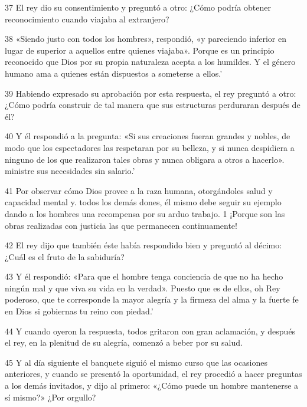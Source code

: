 \par 37 El rey dio su consentimiento y preguntó a otro: ¿Cómo podría obtener reconocimiento cuando viajaba al extranjero?

\par 38 «Siendo justo con todos los hombres», respondió, «y pareciendo inferior en lugar de superior a aquellos entre quienes viajaba». Porque es un principio reconocido que Dios por su propia naturaleza acepta a los humildes. Y el género humano ama a quienes están dispuestos a someterse a ellos.'

\par 39 Habiendo expresado su aprobación por esta respuesta, el rey preguntó a otro: ¿Cómo podría construir de tal manera que sus estructuras perduraran después de él?

\par 40 Y él respondió a la pregunta: «Si sus creaciones fueran grandes y nobles, de modo que los espectadores las respetaran por su belleza, y si nunca despidiera a ninguno de los que realizaron tales obras y nunca obligara a otros a hacerlo». ministre sus necesidades sin salario.'

\par 41 Por observar cómo Dios provee a la raza humana, otorgándoles salud y capacidad mental y. todos los demás dones, él mismo debe seguir su ejemplo dando a los hombres una recompensa por su arduo trabajo. 1 ¡Porque son las obras realizadas con justicia las que permanecen continuamente!

\par 42 El rey dijo que también éste había respondido bien y preguntó al décimo: ¿Cuál es el fruto de la sabiduría?

\par 43 Y él respondió: «Para que el hombre tenga conciencia de que no ha hecho ningún mal y que viva su vida en la verdad». Puesto que es de ellos, oh Rey poderoso, que te corresponde la mayor alegría y la firmeza del alma y la fuerte fe en Dios si gobiernas tu reino con piedad.'

\par 44 Y cuando oyeron la respuesta, todos gritaron con gran aclamación, y después el rey, en la plenitud de su alegría, comenzó a beber por su salud.

\par 45 Y al día siguiente el banquete siguió el mismo curso que las ocasiones anteriores, y cuando se presentó la oportunidad, el rey procedió a hacer preguntas a los demás invitados, y dijo al primero: «¿Cómo puede un hombre mantenerse a sí mismo?» ¿Por orgullo?

